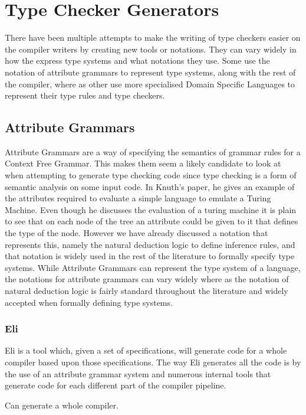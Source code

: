\section{Type Checker Generators}
There have been multiple attempts to make the writing of type checkers easier on the compiler writers by creating new tools or notations.
They can vary widely in how the express type systems and what notations they use.
Some use the notation of attribute grammars to represent type systems, along with the rest of the compiler, where as other use more specialised Domain Specific Languages to represent their type rules and type checkers.

\subsection{Attribute Grammars}
Attribute Grammars are a way of specifying the semantics of grammar rules for a Context Free Grammar.
This makes them seem a likely candidate to look at when attempting to generate type checking code since type checking is a form of semantic analysis on some input code.
In Knuth's paper\cite{Knuth1968}, he gives an example of the attributes required to evaluate a simple language to emulate a Turing Machine.
Even though he discusses the evaluation of a turing machine it is plain to see that on each node of the tree an attribute could be given to it that defines the type of the node.
However we have already discussed a notation that represents this, namely the natural deduction logic to define inference rules, and that notation is widely used in the rest of the literature to formally specify type systems.
While Attribute Grammars can represent the type system of a language, the notations for attribute grammars can vary widely where as the notation of natural deduction logic is fairly standard throughout the literature and widely accepted when formally defining type systems. 

\subsubsection{Eli}
Eli is a tool which, given a set of specifications, will generate code for a whole compiler based upon those specifications\cite{Gray:1992:ECF:129630.129637}.
The way Eli generates all the code is by the use of an attribute grammar system and numerous internal tools that generate code for each different part of the compiler pipeline.

Can generate a whole compiler.

